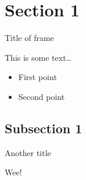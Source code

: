 \section{Section 1}

\begin{frame}{Title of frame}


\vspace{2mm}

This is some text\ldots


\begin{itemize}
  \item First point
  \item Second point
\end{itemize}


\end{frame}

\subsection{Subsection 1}

\begin{frame}{Another title}

Wee!

\end{frame}
